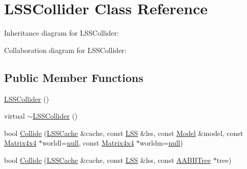 \hypertarget{class_l_s_s_collider}{\section{L\+S\+S\+Collider Class Reference}
\label{class_l_s_s_collider}
}


Inheritance diagram for L\+S\+S\+Collider\+:


Collaboration diagram for L\+S\+S\+Collider\+:
\subsection*{Public Member Functions}
\begin{DoxyCompactItemize}
\item 
\hyperlink{class_l_s_s_collider_a4d249606834d6c0ad1ffb3e350b6fcc8}{L\+S\+S\+Collider} ()
\item 
virtual \hyperlink{class_l_s_s_collider_a51b4c522fb19188b11858d884aec2c55}{$\sim$\+L\+S\+S\+Collider} ()
\item 
bool \hyperlink{class_l_s_s_collider_a4c4ff9f48a8b7b2b01b71beea04ee261}{Collide} (\hyperlink{struct_l_s_s_cache}{L\+S\+S\+Cache} \&cache, const \hyperlink{class_l_s_s}{L\+S\+S} \&lss, const \hyperlink{class_model}{Model} \&model, const \hyperlink{class_matrix4x4}{Matrix4x4} $\ast$worldl=\hyperlink{_ice_types_8h_ac97b8ee753e4405397a42ad5799b0f9e}{null}, const \hyperlink{class_matrix4x4}{Matrix4x4} $\ast$worldm=\hyperlink{_ice_types_8h_ac97b8ee753e4405397a42ad5799b0f9e}{null})
\item 
bool \hyperlink{class_l_s_s_collider_a3e68e9b2ecdbed62116fec0b3ec8d4cd}{Collide} (\hyperlink{struct_l_s_s_cache}{L\+S\+S\+Cache} \&cache, const \hyperlink{class_l_s_s}{L\+S\+S} \&lss, const \hyperlink{class_a_a_b_b_tree}{A\+A\+B\+B\+Tree} $\ast$tree)
\end{DoxyCompactItemize}
